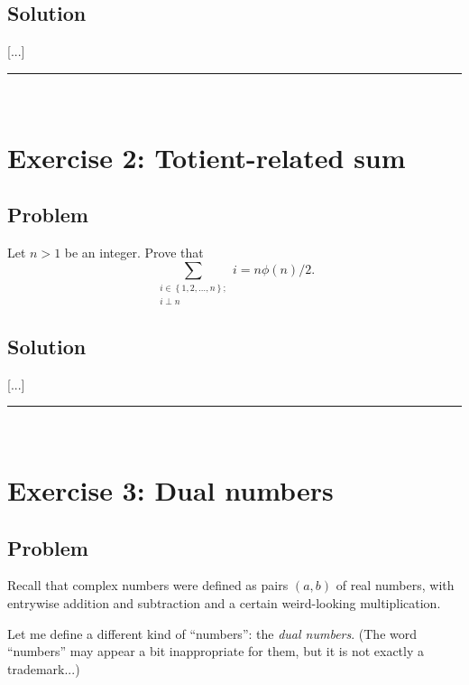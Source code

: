 \documentclass[paper=a4, fontsize=12pt]{scrartcl} %
\newcommand{\set}[1]{\left\{ #1 \right\}}
\newcommand{\tup}[1]{\left( #1 \right)}
\newcommand{\horrule}[1]{\rule{\linewidth}{#1}} %
\let\sumnonlimits\sum
\renewcommand{\sum}{\sumnonlimits\limits}
\theoremstyle{plainsl}
\theoremstyle{definition}
\theoremstyle{remark}
\begin{document}
\subsection{Solution}

[...]

\horrule{0.3pt} \\[0.4cm]

\section{Exercise 2: Totient-related sum}

\subsection{Problem}

Let $n > 1$ be an integer. Prove that
\[
\sum_{\substack{i \in \set{1, 2, \ldots, n}; \\ i \perp n}} i
= n \phi\tup{n} / 2 .
\]

\subsection{Solution}

[...]

\horrule{0.3pt} \\[0.4cm]

\section{Exercise 3: Dual numbers}

\subsection{Problem}

Recall that complex numbers were defined as pairs
$\tup{a, b}$ of real numbers, with entrywise addition
and subtraction and a certain weird-looking
multiplication.

Let me define a different kind of ``numbers'': the
\textit{dual numbers}.
(The word ``numbers'' may appear a bit inappropriate
for them, but it is not exactly a trademark...)
\end{document}
